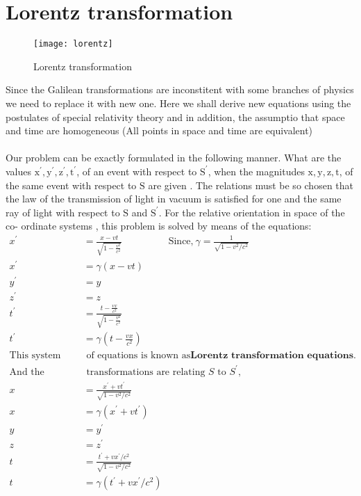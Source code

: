  \section{Lorentz transformation}
\begin{figure}[H]
	\centering
	\texttt{[image: lorentz]}
	\caption{Lorentz transformation}
	\label{}
\end{figure}
Since the Galilean transformations are inconstitent with some branches of physics we need to replace it with new one. Here we shall derive new equations  using the postulates of special relativity theory and in addition, the assumptio that space and time are homogeneous (All points in space and time are equivalent) \\\\
Our problem can be exactly formulated in the following manner. What are the
values $\mathrm{x}^{\prime}, \mathrm{y}^{\prime}, \mathrm{z}^{\prime}, \mathrm{t}^{\prime}$, of an event with respect to $\mathrm{S}^{\prime}$, when the magnitudes $\mathrm{x}, \mathrm{y}, \mathrm{z}, \mathrm{t}$, of the
same event with respect to $\mathrm{S}$ are given . The relations must be so chosen that the law of the
transmission of light in vacuum is satisfied for one and the same ray of light
 with respect to $\mathrm{S}$ and $\mathrm{S}^{\prime}$. For the relative orientation in space of the co-
ordinate systems , this problem is solved by means of the equations:
\begin{align*}
	x^{\prime} &=\frac{x-v t}{\sqrt{1-\frac{v^{2}}{c^{2}}}} \hspace{2cm} \text{Since,}\ \gamma=\frac{1}{\sqrt{1-v^{2} / c^{2}}} \\
	x^{\prime} &=\gamma ({x-v t})\\
	y^{\prime} &=y \\
	z^{\prime} &=z \\
	t^{\prime} &=\frac{t-\frac{v x}{c^{2}}}{\sqrt{1-\frac{v^{2}}{c^{2}}}}\\
	t^{\prime} &=\gamma ({t-\frac{v x}{c^{2}}})\\
	\text{This system} &\text{ of equations is known as} \textbf{Lorentz transformation equations}.\\
\text{And the inverse}&\text{ transformations are relating $S$\ to \ $S^{\prime}$,}\\
	x&=\frac{x^{\prime}+v t^{\prime}}{\sqrt{1-v^{2} / c^{2}}} \\
	x&=\gamma (x^{\prime}+v t^{\prime})\\
	y&=y^{\prime} \\
	z&=z^{\prime} \\
	t&=\frac{t^{\prime}+v x^{\prime} / c^{2}}{\sqrt{1-v^{2} / c^{2}}}\\
	t&=\gamma ( t^{\prime}+v x^{\prime} / c^{2})
\end{align*}

